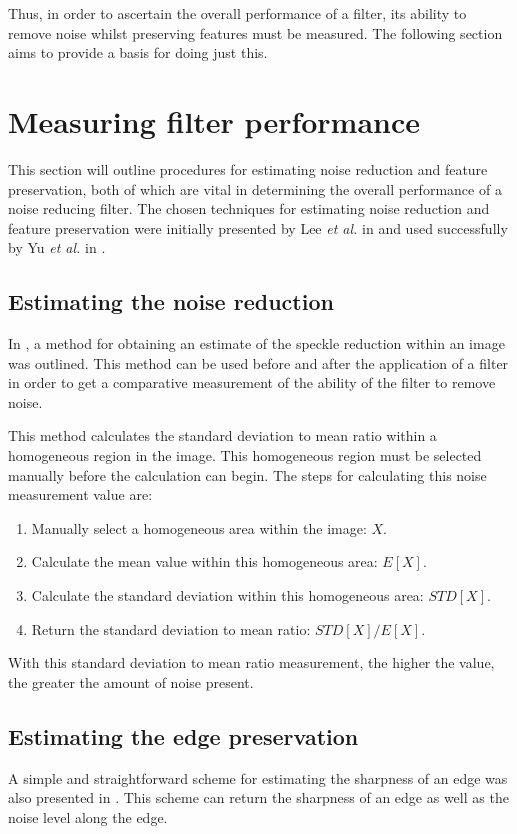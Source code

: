 \documentclass[12pt]{report}
\begin{document}
Thus, in order to ascertain the overall performance of a filter, its ability to 
remove noise whilst preserving features must be measured.
The following section aims to provide a basis for doing just this.

\section{Measuring filter performance}
\label{ourChosen}
This section will outline procedures for estimating noise reduction and 
feature preservation, both of which are vital in determining the overall 
performance of a noise reducing filter. 
The chosen techniques for estimating noise reduction and feature preservation
were initially 
presented by Lee \emph{et al.} in \cite{lee94}
and used successfully by Yu \emph{et al.} in \cite{yu96}.

\subsection{Estimating the noise reduction}
\label{subsec:noiseRed}
In \cite{lee94}, a method for obtaining an estimate of the speckle reduction
within an image was outlined. This method can be used before and after the application
of a filter in order to get a comparative measurement of the 
ability of the filter to remove noise.

This method calculates the standard deviation
to mean ratio within a homogeneous region in the image. This homogeneous
region must be selected manually before the calculation can begin. The steps
for calculating this noise measurement value are:

\begin{enumerate}
	\item Manually select a homogeneous area within the image: $X$.
	\item Calculate the mean value within this homogeneous area: $E[X]$.
	\item Calculate the standard deviation within this homogeneous area: $STD[X]$.
	\item Return the standard deviation to mean ratio: $STD[X] / E[X]$.
\end{enumerate}

With this standard deviation to mean ratio measurement, the higher the value, the greater 
the amount of noise present.

\subsection{Estimating the edge preservation}
\label{subsec:edgeSharp}
A simple and straightforward scheme for estimating the sharpness of an edge was also presented in \cite{lee94}.
This scheme can return the sharpness of an edge
as well as the noise level along the edge.
\end{document}

